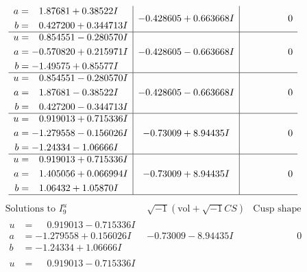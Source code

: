 \documentclass[1p]{elsarticle_modified}
\theoremstyle{definition}
\newcommand{\I}{\sqrt{-1}}
\begin{document}
$$\begin{array}{c|c|c}
\begin{aligned}
a &= \phantom{-}1.87681 + 0.38522 I \\
b &= \phantom{-}0.427200 + 0.344713 I\end{aligned}
 & -0.428605 + 0.663668 I & \phantom{-0.000000 } 0 \\ \hline\begin{aligned}
u &= \phantom{-}0.854551 - 0.280570 I \\
a &= -0.570820 + 0.215971 I \\
b &= -1.49575 + 0.85577 I\end{aligned}
 & -0.428605 - 0.663668 I & \phantom{-0.000000 } 0 \\ \hline\begin{aligned}
u &= \phantom{-}0.854551 - 0.280570 I \\
a &= \phantom{-}1.87681 - 0.38522 I \\
b &= \phantom{-}0.427200 - 0.344713 I\end{aligned}
 & -0.428605 - 0.663668 I & \phantom{-0.000000 } 0 \\ \hline\begin{aligned}
u &= \phantom{-}0.919013 + 0.715336 I \\
a &= -1.279558 - 0.156026 I \\
b &= -1.24334 - 1.06666 I\end{aligned}
 & -0.73009 + 8.94435 I & \phantom{-0.000000 } 0 \\ \hline\begin{aligned}
u &= \phantom{-}0.919013 + 0.715336 I \\
a &= \phantom{-}1.405056 + 0.066994 I \\
b &= \phantom{-}1.06432 + 1.05870 I\end{aligned}
 & -0.73009 + 8.94435 I & \phantom{-0.000000 } 0\\
 \hline 
 \end{array}$$\newpage$$\begin{array}{c|c|c}  
\text{Solutions to }I^u_{9}& \I (\text{vol} + \sqrt{-1}CS) & \text{Cusp shape}\\
 \hline 
\begin{aligned}
u &= \phantom{-}0.919013 - 0.715336 I \\
a &= -1.279558 + 0.156026 I \\
b &= -1.24334 + 1.06666 I\end{aligned}
 & -0.73009 - 8.94435 I & \phantom{-0.000000 } 0 \\ \hline\begin{aligned}
u &= \phantom{-}0.919013 - 0.715336 I \\

\end{aligned}
\end{array}$$
\end{document}
